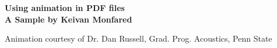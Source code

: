 \documentclass{beamer}
\begin{document}
	\begin{frame}
		\begin{center}
			{\LARGE \textbf{Using animation in PDF files\\[1cm]}}
			{\textbf{\large A Sample by Keivan Monfared}} \\
		\end{center}
		\begin{center}
		    \vspace*{1.5cm}
			\vspace*{.5cm}
		\end{center}
		\vfill
		\begin{flushright}
			\tiny{Animation courtesy of Dr. Dan Russell, Grad. Prog. Acoustics, Penn State}
		\end{flushright}
	\end{frame}
\end{document}
